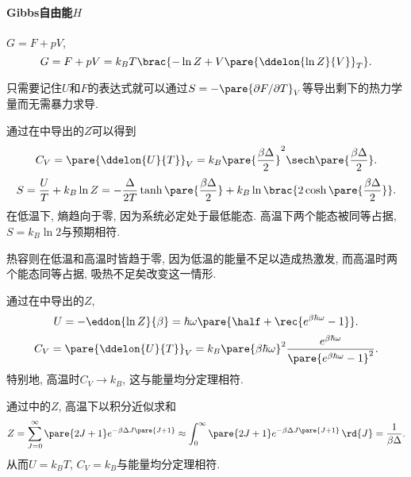 \documentclass[../Thermal.tex]{subfiles}
\begin{document}
\paragraph{Gibbs自由能$H$} $G = F + pV$,
\[ G = F + pV = k_B T\brac{-\ln Z + V\pare{\ddelon{\ln Z}{V}}_T}. \]
\begin{remark}
只需要记住$U$和$F$的表达式就可以通过$S = -\pare{\partial F/\partial T}_V$等导出剩下的热力学量而无需暴力求导.
\end{remark}
\begin{ex}[二能级系统]
通过在中导出的$Z$可以得到
\[ C_V = \pare{\ddelon{U}{T}}_V = k_B\pare{\frac{\beta \Delta}{2}}^2\sech\pare{\frac{\beta\Delta}{2}}. \]
\[ S = \frac{U}{T} + k_B\ln Z = -\frac{\Delta}{2T}\tanh\pare{\frac{\beta \Delta}{2}} + k_B \ln \brac{2\cosh\pare{\frac{\beta \Delta}{2}}}. \]
在低温下, 熵趋向于零, 因为系统必定处于最低能态. 高温下两个能态被同等占据, $S=k_B\ln 2$与预期相符. 
\par
热容则在低温和高温时皆趋于零, 因为低温的能量不足以造成热激发, 而高温时两个能态同等占据, 吸热不足矣改变这一情形.
\end{ex}
\begin{ex}[谐振子]
通过在中导出的$Z$,
\begin{equation}
\label{eq:uofharmonic}
U = -\eddon{\ln Z}{\beta} = \hbar\omega\pare{\half + \rec{e^{\beta\hbar\omega} - 1}}.
\end{equation}
\[ C_V = \pare{\ddelon{U}{T}}_V = k_B\pare{\beta\hbar\omega}^2\frac{e^{\beta\hbar\omega}}{\pare{e^{\beta\hbar\omega}-1}^2}. \]
特别地, 高温时$C_V\rightarrow k_B$, 这与能量均分定理相符.
\end{ex}
\begin{ex}[转动双原子分子]
通过中的$Z$, 高温下以积分近似求和
\[ Z = \sum_{J=0}^\infty \pare{2J+1}e^{-\beta\Delta J\pare{J+1}} \approx \int_0^\infty \pare{2J+1}e^{-\beta\Delta J\pare{J+1}}\,\rd{J} = \frac{1}{\beta \Delta}. \]
从而$U=k_BT$, $C_V=k_B$与能量均分定理相符.
\end{ex}
\end{document}
